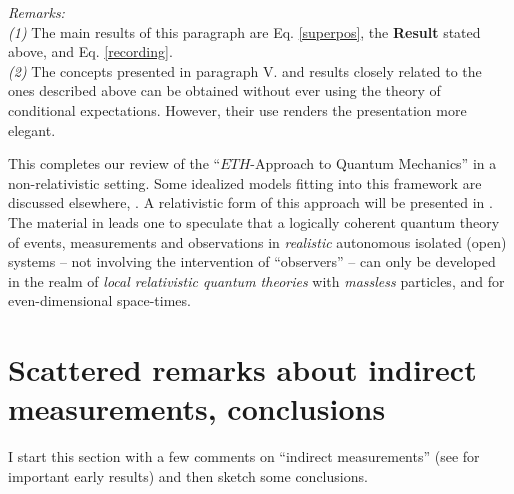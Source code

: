 \documentclass[a4paper,11pt]{article}
\begin{document}
\begin{enumerate}
{\textit{Remarks:}\\ 
\textit{(1)} The main results of this paragraph are Eq. \eqref{superpos}, the {\bf{Result}} stated above, and Eq. \eqref{recording}.
\\
\textit{(2)} The concepts presented in paragraph V. and results closely related to the ones described above can be obtained without ever using the theory of conditional expectations. However, their use renders the presentation more elegant.
}
\end{enumerate}
This completes our review of the ``$ETH$-Approach to Quantum Mechanics'' in a non-relativistic setting. Some idealized models fitting into this framework are discussed elsewhere, \cite{Les-Diablerets}. A relativistic form of this approach will be presented in \cite{Fr}. The material in \cite{Fr} leads one to speculate that a logically coherent quantum theory of events, measurements and observations in \textit{realistic} autonomous isolated (open) systems -- not involving the intervention of ``observers'' -- can only be developed in the realm of \textit{local relativistic quantum theories} with \textit{massless} particles, and for even-dimensional space-times.

\section{Scattered remarks about indirect measurements, conclusions}
I start this section with a few comments on ``indirect measurements'' (see \cite{Kraus, Maassen-Kummerer} for important early results) and then sketch some conclusions.
\end{document}
